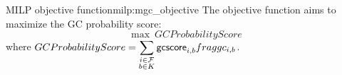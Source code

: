 \begin{definition}{\MGC{} MILP objective function}{milp:mgc_objective}
    The objective function aims to maximize the GC probability score:
    \begin{equation}
        \max ~ GCProbabilityScore
    \end{equation}
    where \(
        \displaystyle GCProbabilityScore = \sum_{\substack{
            i \in \Fragments{} \\
            b \in K
        }} \gcscore{i}{b} \fraggc{i}{b}%
    \).
\end{definition}